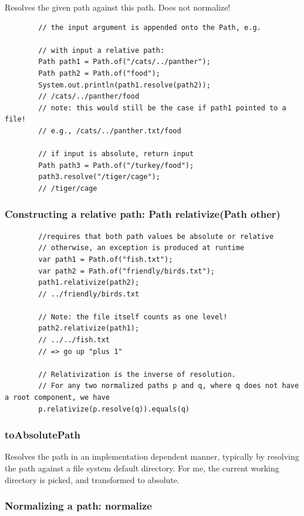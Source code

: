 \documentclass{scrartcl}
\begin{document}
    Resolves the given path against this path. Does not normalize!

    \begin{lstlisting}
        // the input argument is appended onto the Path, e.g.

        // with input a relative path:
        Path path1 = Path.of("/cats/../panther");
        Path path2 = Path.of("food");
        System.out.println(path1.resolve(path2));
        // /cats/../panther/food
        // note: this would still be the case if path1 pointed to a file!
        // e.g., /cats/../panther.txt/food

        // if input is absolute, return input
        Path path3 = Path.of("/turkey/food");
        path3.resolve("/tiger/cage");
        // /tiger/cage
    \end{lstlisting}

\subsubsection{Constructing a relative path: Path relativize(Path other)}

    \begin{lstlisting}
        //requires that both path values be absolute or relative
        // otherwise, an exception is produced at runtime
        var path1 = Path.of("fish.txt");
        var path2 = Path.of("friendly/birds.txt");
        path1.relativize(path2);
        // ../friendly/birds.txt

        // Note: the file itself counts as one level!
        path2.relativize(path1);
        // ../../fish.txt
        // => go up "plus 1"

        // Relativization is the inverse of resolution.
        // For any two normalized paths p and q, where q does not have a root component, we have
        p.relativize(p.resolve(q)).equals(q)
    \end{lstlisting}


\subsubsection{toAbsolutePath}

    Resolves the path in an implementation dependent manner, typically by resolving the path against a file system default directory.
    For me, the current working directory is picked, and transformed to absolute.

\subsubsection{Normalizing a path: normalize}
\end{document}
